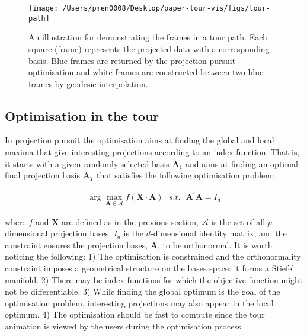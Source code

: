 \begin{Schunk}
\begin{figure}

{\centering \texttt{[image: /Users/pmen0008/Desktop/paper-tour-vis/figs/tour-path]} 

}

\caption[An illustration for demonstrating the frames in a tour path]{An illustration for demonstrating the frames in a tour path. Each square (frame) represents the projected data with a corresponding basis. Blue frames are returned by the projection pursuit optimisation and white frames are constructed between two blue frames by geodesic interpolation.}\label{fig:tour-path}
\end{figure}
\end{Schunk}

\hypertarget{tour-optim}{%
\subsection{Optimisation in the tour}\label{tour-optim}}

In projection pursuit the optimisation aims at finding the global and
local maxima that give interesting projections according to an index
function. That is, it starts with a given randomly selected basis
\(\mathbf{A}_1\) and aims at finding an optimal final projection basis
\(\mathbf{A}_T\) that satisfies the following optimisation problem:

\begin{align}
\arg \max_{\mathbf{A} \in \mathcal{A}} f(\mathbf{X} \cdot \mathbf{A})  ~~~ s.t. ~~~ \mathbf{A}^{\prime} \mathbf{A} = I_d
\end{align}

\noindent where \(f\) and \(\mathbf{X}\) are defined as in the previous
section, \(\mathcal{A}\) is the set of all \(p\)-dimensional projection
bases, \(I_d\) is the \(d\)-dimensional identity matrix, and the
constraint ensures the projection bases, \(\mathbf{A}\), to be
orthonormal. It is worth noticing the following: 1) The optimisation is
constrained and the orthonormality constraint imposes a geometrical
structure on the bases space: it forms a Stiefel manifold. 2) There may
be index functions for which the objective function might not be
differentiable. 3) While finding the global optimum is the goal of the
optimisation problem, interesting projections may also appear in the
local optimum. 4) The optimisation should be fast to compute since the
tour animation is viewed by the users during the optimisation process.

